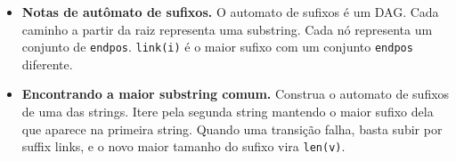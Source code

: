 \begin{itemize}[leftmargin=*,label={}]
	\item \textbf{Notas de autômato de sufixos.}
		O automato de sufixos é um DAG. Cada caminho a partir da raiz representa uma substring. Cada nó representa um conjunto de \texttt{endpos}. \texttt{link(i)} é o maior sufixo com um conjunto \texttt{endpos} diferente.

\ifextended\else
	\item \textbf{Encontrando a maior substring comum.}
		Construa o automato de sufixos de uma das strings. Itere pela segunda string mantendo o maior sufixo dela que aparece na primeira string. Quando uma transição falha, basta subir por suffix links, e o novo maior tamanho do sufixo vira \texttt{len(v)}.
\fi

\end{itemize}


